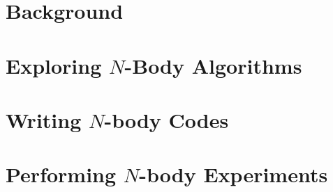 \documentclass{book}
\begin{document}
  \frontmatter
%
%
%
%
%
%
%
%
%
    
  \mainmatter
    \part{Background}
      
    \part{Exploring $N$-Body Algorithms}
      
      
      
      
      
    \part{Writing $N$-body Codes}
      
      
    \part{Performing $N$-body Experiments}
      
      
      
%      
%      
  \backmatter
\end{document}
